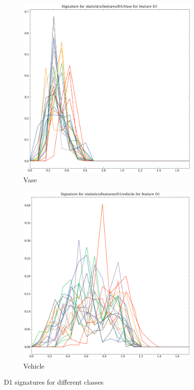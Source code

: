\begin{figure}
    \begin{subfigure}[b]{0.23\textwidth}
        \includegraphics[width=\textwidth]{assets/feature_extraction/D1/Vase.png}
        \caption{Vase}
        \label{fig:features-statistics-D1-y}    
    \end{subfigure}
    \hfill
    \begin{subfigure}[b]{0.23\textwidth}
        \includegraphics[width=\textwidth]{assets/feature_extraction/D1/vehicle.png}
        \caption{Vehicle}
        \label{fig:features-statistics-D1-z}    
    \end{subfigure}
    \hfill
    
    \caption{D1 signatures for different classes}
    \label{fig:D1-signatures-2}
\end{figure}

